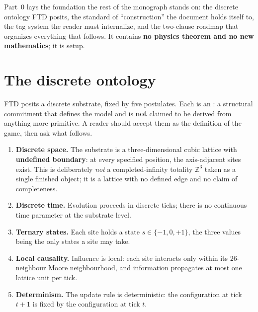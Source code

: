 \noindent Part~0 lays the foundation the rest of the monograph stands on: the
discrete ontology FTD posits, the standard of ``construction'' the document
holds itself to, the tag system the reader must internalize, and the two-clause
roadmap that organizes everything that follows. It contains \textbf{no physics
theorem and no new mathematics}; it is setup.

\section{The discrete ontology}\label{sec:ontology}
FTD posits a discrete substrate, fixed by five postulates. Each is an
: a structural commitment that defines the model and is
\textbf{not} claimed to be derived from anything more primitive. A reader
should accept them as the definition of the game, then ask what follows.
%
\begin{enumerate}[leftmargin=2.2em, itemsep=3pt, label=\arabic*.]
  \item \textbf{Discrete space.} The substrate is a three-dimensional cubic
        lattice with \textbf{undefined boundary}: at every specified position,
        the axis-adjacent sites exist. This is deliberately \emph{not} a
        completed-infinity totality $\mathbb{Z}^3$ taken as a single finished
        object; it is a lattice with no defined edge and no claim of
        completeness.
  \item \textbf{Discrete time.} Evolution proceeds in discrete ticks; there is
        no continuous time parameter at the substrate level.
  \item \textbf{Ternary states.} Each site holds a state $s\in\{-1,0,+1\}$, the
        three values being the only states a site may take.
  \item \textbf{Local causality.} Influence is local: each site interacts only
        within its 26-neighbour Moore neighbourhood, and information propagates
        at most one lattice unit per tick.
  \item \textbf{Determinism.} The update rule is deterministic: the
        configuration at tick $t+1$ is fixed by the configuration at tick $t$.
\end{enumerate}

